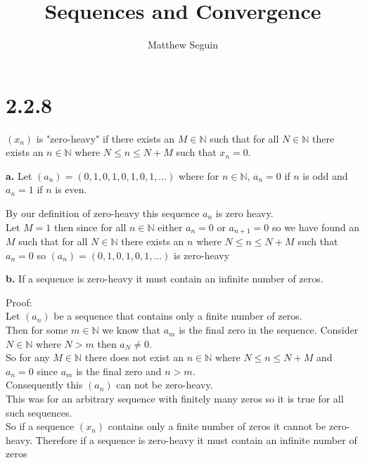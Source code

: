 \documentclass{article}
\title{Sequences and Convergence}
\author{Matthew Seguin}
\date{}
\begin{document}
\maketitle


\section*{2.2.8} 
\begin{center}
    $(x_n)$ is "zero-heavy" if there exists an $M\in\mathbb{N}$ such that for all $N\in\mathbb{N}$ there exists an $n\in\mathbb{N}$ where $N\leq n\leq N + M$ such that $x_n = 0$.
\end{center}

{\Large \textbf{a.}} Let $(a_n) = (0, 1, 0, 1, 0, 1, 0, 1, ...)$ where for $n\in\mathbb{N}$, $a_n = 0$ if $n$ is odd and $a_n = 1$ if $n$ is even.
\begin{center}
    \doublespacing
    By our definition of zero-heavy this sequence $a_n$ is zero heavy.
    \\Let $M = 1$ then since for all $n\in\mathbb{N}$ either $a_n = 0$ or $a_{n+1} = 0$ so we have found an $M$ such that for all $N\in\mathbb{N}$ there exists an $n$ where $N\leq n\leq N + M$ such that $a_n = 0$ so $(a_n) = (0, 1, 0, 1, 0, 1, ...)$ is zero-heavy \qedsymbol
\end{center}

{\Large \textbf{b.}} If a sequence is zero-heavy it must contain an infinite number of zeros.
\begin{center}
    \doublespacing
    Proof:
    \\Let $(a_n)$ be a sequence that contains only a finite number of zeros.
    \\Then for some $m\in\mathbb{N}$ we know that $a_m$ is the final zero in the sequence. Consider $N\in\mathbb{N}$ where $N > m$ then $a_N\neq 0$.
    \\So for any $M\in\mathbb{N}$ there does not exist an $n\in\mathbb{N}$ where $N\leq n\leq N + M$ and $a_n = 0$ since $a_m$ is the final zero and $n > m$.
    \\Consequently this $(a_n)$ can not be zero-heavy.
    \\This was for an arbitrary sequence with finitely many zeros so it is true for all such sequences.
    \\So if a sequence $(x_n)$ contains only a finite number of zeros it cannot be zero-heavy. Therefore if a sequence is zero-heavy it must contain an infinite number of zeros \qedsymbol
\end{center}
\end{document}
